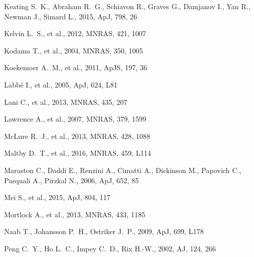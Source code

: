 \documentclass[a4paper,fleqn,usenatbib,useAMS]{mnras}
\begin{document}
\begin{thebibliography}{}
 Keating S.~K., Abraham R.~G.,
  Schiavon R., Graves G., Damjanov I., Yan R., Newman J., Simard L.,
  2015, ApJ, 798, 26



Kelvin L.~S., et al., 2012, MNRAS, 421, 1007 


Kodama T., et al., 2004, MNRAS, 350, 1005 


 Koekemoer A.~M., et al., 2011, ApJS, 197, 
36 


 Labb{\'e} I., et al., 2005, ApJ, 624, L81 


Lani C., et al., 2013, MNRAS, 435, 207 


 Lawrence A., et al., 2007, MNRAS, 379, 
1599 


McLure R.~J., et al., 2013, MNRAS, 428, 1088 


 Maltby D.~T., et al., 2016, MNRAS, 459, L114 




 Maraston C., Daddi E., Renzini A., Cimatti 
A., Dickinson M., Papovich C., Pasquali A., Pirzkal N., 2006, ApJ, 652, 85 


 Mei S., et al., 2015, ApJ, 804, 117 


 Mortlock A., et al., 2013, MNRAS, 433, 
1185 


 Naab T., Johansson P.~H., Ostriker J.~P., 2009, ApJ, 699, L178 


Peng C.~Y., Ho L.~C., Impey C.~D., Rix H.-W., 2002, AJ, 124, 266 





\end{thebibliography}
\end{document}
